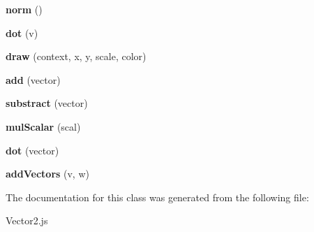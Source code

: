 \begin{DoxyCompactItemize}
{\bfseries norm} ()
\item 
\mbox{\label{class_vector2_a1d98ab6f1dc33e5ce8db9d54aec4d756}} 
{\bfseries dot} (v)
\item 
\mbox{\label{class_vector2_a4f474d20a07dc489fe5d179d3b84fb56}} 
{\bfseries draw} (context, x, y, scale, color)
\item 
\mbox{\label{class_vector2_aacfd38c004be74608e349a2d4624afeb}} 
{\bfseries add} (vector)
\item 
\mbox{\label{class_vector2_a2d5e60d14f6b7493dcef4590d3313a37}} 
{\bfseries substract} (vector)
\item 
\mbox{\label{class_vector2_a7b3aab230259ad2c9898e8b83b7a2984}} 
{\bfseries mul\+Scalar} (scal)
\item 
\mbox{\label{class_vector2_a6f63b174661da4a6a8c0fb3547241e86}} 
{\bfseries dot} (vector)
\item 
\mbox{\label{class_vector2_a271449959fdc8715172defc7de11d547}} 
{\bfseries add\+Vectors} (v, w)
\end{DoxyCompactItemize}


The documentation for this class was generated from the following file\+:\begin{DoxyCompactItemize}
\item 
Vector2.\+js\end{DoxyCompactItemize}
